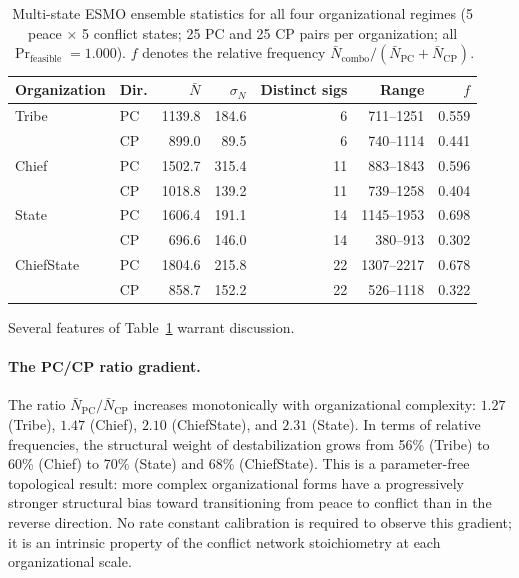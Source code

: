 \begin{table}[ht]
  \centering
  \caption{Multi-state ESMO ensemble statistics for all four organizational
    regimes (5 peace $\times$ 5 conflict states; 25 PC and 25 CP pairs per
    organization; all $\Pr_{\text{feasible}} = 1.000$).
    $f$ denotes the relative frequency $\bar{N}_{\text{combo}} /
    (\bar{N}_{\text{PC}} + \bar{N}_{\text{CP}})$.}
  \label{tab:all_intra}
  \begin{tabular}{llrrrrr}
    \hline
    Organization & Dir. & $\bar{N}$ & $\sigma_N$ & Distinct sigs & Range & $f$ \\
    \hline
    Tribe & PC & 1139.8 & 184.6 & 6  & 711--1251   & 0.559 \\
          & CP &  899.0 &  89.5 & 6  & 740--1114   & 0.441 \\
    \hline
    Chief & PC & 1502.7 & 315.4 & 11 & 883--1843   & 0.596 \\
          & CP & 1018.8 & 139.2 & 11 & 739--1258   & 0.404 \\
    \hline
    State & PC & 1606.4 & 191.1 & 14 & 1145--1953  & 0.698 \\
          & CP &  696.6 & 146.0 & 14 & 380--913    & 0.302 \\
    \hline
    ChiefState & PC & 1804.6 & 215.8 & 22 & 1307--2217 & 0.678 \\
               & CP &  858.7 & 152.2 & 22 & 526--1118  & 0.322 \\
    \hline
  \end{tabular}
\end{table}

Several features of Table~\ref{tab:all_intra} warrant discussion.

\paragraph{The PC/CP ratio gradient.}
The ratio $\bar{N}_{\text{PC}} / \bar{N}_{\text{CP}}$ increases
monotonically with organizational complexity: $1.27$ (Tribe), $1.47$
(Chief), $2.10$ (ChiefState), and $2.31$ (State).  In terms of relative
frequencies, the structural weight of destabilization grows from 56\%
(Tribe) to 60\% (Chief) to 70\% (State) and 68\% (ChiefState).
This is a parameter-free topological result: more complex organizational
forms have a progressively stronger structural bias toward transitioning
from peace to conflict than in the reverse direction.  No rate constant
calibration is required to observe this gradient; it is an intrinsic
property of the conflict network stoichiometry at each organizational scale.

